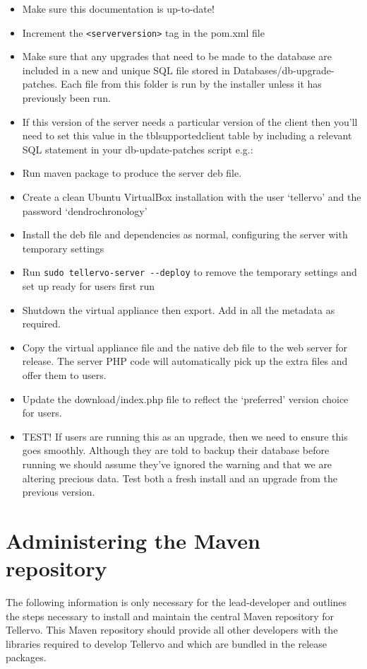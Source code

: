 \begin{itemize}
 \item Make sure this documentation is up-to-date! 
 \item Increment the \verb|<serverversion>| tag in the pom.xml file
 \item Make sure that any upgrades that need to be made to the database are included in a new and unique SQL file stored in Databases/db-upgrade-patches.  Each file from this folder is run by the installer unless it has previously been run.  
 \item If this version of the server needs a particular version of the client then you'll need to set this value in the tblsupportedclient table by including a relevant SQL statement in your db-update-patches script e.g.: 
 \item Run maven package to produce the server deb file.
 \item Create a clean Ubuntu VirtualBox installation with the user `tellervo' and the password `dendrochronology'
 \item Install the deb file and dependencies as normal, configuring the server with temporary settings
 \item Run \verb|sudo tellervo-server --deploy| to remove the temporary settings and set up ready for users first run
 \item Shutdown the virtual appliance then export.  Add in all the metadata as required.
 \item Copy the virtual appliance file and the native deb file to the web server for release.  The server PHP code will automatically pick up the extra files and offer them to users.  
 \item Update the download/index.php file to reflect the `preferred' version choice for users.
 \item TEST!  If users are running this as an upgrade, then we need to ensure this goes smoothly.  Although they are told to backup their database before running we should assume they've ignored the warning and that we are altering precious data. Test both a fresh install and an upgrade from the previous version.
\end{itemize}



\section{Administering the Maven repository}
The following information is only necessary for the lead-developer and outlines the steps necessary to install and maintain the central Maven repository for Tellervo.  This Maven repository should provide all other developers with the libraries required to develop Tellervo and which are bundled in the release packages.

